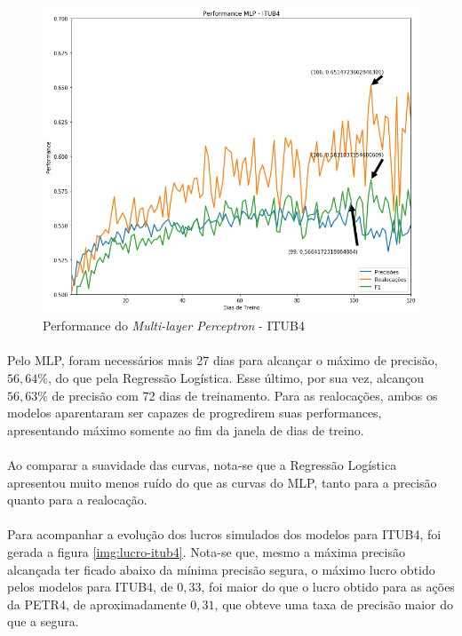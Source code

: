 \documentclass[grad,numbers]{coppe}
\begin{document}
            \begin{figure}[h!]
                \caption{Performance do \textit{Multi-layer Perceptron} - ITUB4}
                \label{img:performance-mlp-itub4}
                \includegraphics[width=13.1cm]{performance-mlp-itub4.png}
                \centering
            \end{figure}
        
        \paragraph{}Pelo MLP, foram necessários mais 27 dias para alcançar o máximo de precisão, $56,64\%$, do que pela Regressão Logística. Esse último, por sua vez, alcançou $56,63\%$ de precisão com 72 dias de treinamento. Para as realocações, ambos os modelos aparentaram ser capazes de progredirem suas performances, apresentando máximo somente ao fim da janela de dias de treino.
        
        \paragraph{}Ao comparar a suavidade das curvas, nota-se que a Regressão Logística apresentou muito menos ruído do que as curvas do MLP, tanto para a precisão quanto para a realocação.
        
        \paragraph{}Para acompanhar a evolução dos lucros simulados dos modelos para ITUB4, foi gerada a figura \ref{img:lucro-itub4}. Nota-se que, mesmo a máxima precisão alcançada ter ficado abaixo da mínima precisão segura, o máximo lucro obtido pelos modelos para ITUB4, de $0,33$, foi maior do que o lucro obtido para as ações da PETR4, de aproximadamente $0,31$, que obteve uma taxa de precisão maior do que a segura.
        
\end{document}
